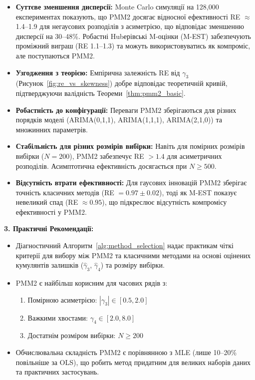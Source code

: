 \documentclass[12pt,a4paper]{article}
\begin{document}
\begin{itemize}
    \item \textbf{Суттєве зменшення дисперсії:} Monte Carlo симуляції на 128,000 експериментах показують, що PMM2 досягає відносної ефективності RE $\approx$ 1.4--1.9 для негаусових розподілів з асиметрією, що відповідає зменшенню дисперсії на 30--48\%. Робастні Hubерівські M-оцінки (M-EST) забезпечують проміжний виграш (RE 1.1--1.3) та можуть використовуватись як компроміс, але поступаються PMM2.

    \item \textbf{Узгодження з теорією:} Емпірична залежність RE від $\gamma_3$ (Рисунок~\ref{fig:re_vs_skewness}) добре відповідає теоретичній кривій, підтверджуючи валідність Теореми~\ref{thm:pmm2_basic}.

    \item \textbf{Робастність до конфігурації:} Переваги PMM2 зберігаються для різних порядків моделі (ARIMA(0,1,1), ARIMA(1,1,1), ARIMA(2,1,0)) та множинних параметрів.

    \item \textbf{Стабільність для різних розмірів вибірки:} Навіть для помірних розмірів вибірки ($N = 200$), PMM2 забезпечує RE $> 1.4$ для асиметричних розподілів. Асимптотична ефективність досягається при $N \geq 500$.

    \item \textbf{Відсутність втрати ефективності:} Для гаусових інновацій PMM2 зберігає точність класичних методів (RE $= 0.97 \pm 0.02$), тоді як M-EST показує невеликий спад (RE $\approx 0.95$), що підкреслює відсутність компромісу ефективності у PMM2.
\end{itemize}

\textbf{3. Практичні Рекомендації:}

\begin{itemize}
    \item Діагностичний Алгоритм~\ref{alg:method_selection} надає практикам чіткі критерії для вибору між PMM2 та класичними методами на основі оцінених кумулянтів залишків ($\hat{\gamma}_3$, $\hat{\gamma}_4$) та розміру вибірки.

    \item PMM2 є найбільш корисним для часових рядів з:
    \begin{enumerate}
        \item Помірною асиметрією: $|\gamma_3| \in [0.5, 2.0]$
        \item Важкими хвостами: $\gamma_4 \in [2.0, 8.0]$
        \item Достатнім розміром вибірки: $N \geq 200$
    \end{enumerate}

    \item Обчислювальна складність PMM2 є порівнянною з MLE (лише 10--20\% повільніше за OLS), що робить метод придатним для великих наборів даних та практичних застосувань.
\end{itemize}
\end{document}
